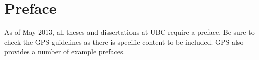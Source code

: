 
\chapter{Preface}

As of May 2013, all theses and dissertations at \ac{UBC} require a 
preface. Be sure to check the \ac{GPS} guidelines as there is specific 
content to be included. \ac{GPS} also provides a number of example 
prefaces.
